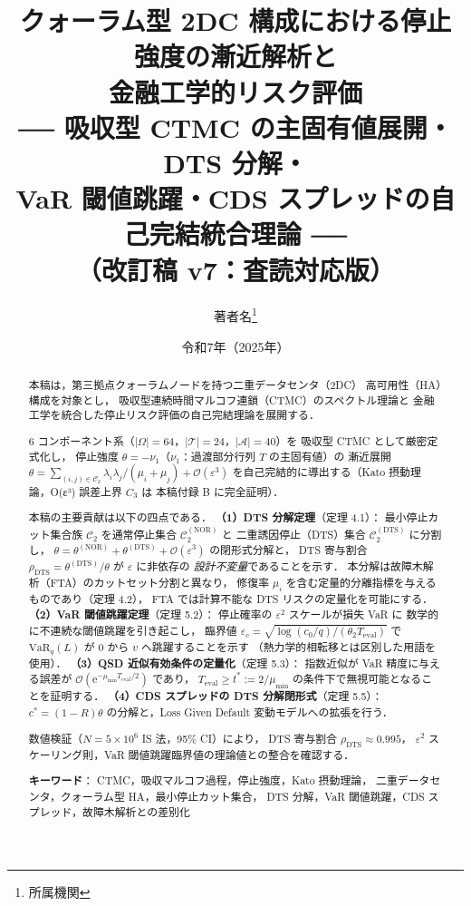 \documentclass[12pt,a4paper]{article}
\title{%
  \textbf{クォーラム型 2DC 構成における停止強度の漸近解析と\\
  金融工学的リスク評価}\\[0.5em]
  \large
  ── 吸収型 CTMC の主固有値展開・DTS 分解・\\
  VaR 閾値跳躍・CDS スプレッドの自己完結統合理論 ──\\[0.3em]
  \small（改訂稿 v7：査読対応版）
}
\author{著者名\thanks{所属機関}}
\date{令和7年（2025年）}
\theoremstyle{plain}
\theoremstyle{definition}
\theoremstyle{remark}
\newcommand{\calO}{\mathcal{O}}
\newcommand{\calA}{\mathcal{A}}
\newcommand{\calT}{\mathcal{T}}
\newcommand{\eps}{\varepsilon}
\newcommand{\e}{\mathrm{e}}
\newcommand{\VaR}{\mathrm{VaR}}
\newcommand{\calCtwo}{\mathcal{C}_2}
\newcommand{\calCNOR}{\calCtwo^{(\mathrm{NOR})}}
\newcommand{\calCDTS}{\calCtwo^{(\mathrm{DTS})}}
\newcommand{\thetaNOR}{\theta^{(\mathrm{NOR})}}
\newcommand{\thetaDTS}{\theta^{(\mathrm{DTS})}}
\newcommand{\rhoDTS}{\rho_{\mathrm{DTS}}}
\newcommand{\Teval}{T_{\mathrm{eval}}}
\begin{document}
\maketitle\thispagestyle{empty}

\begin{abstract}
本稿は，第三拠点クォーラムノードを持つ二重データセンタ（2DC）
高可用性（HA）構成を対象とし，
吸収型連続時間マルコフ連鎖（CTMC）のスペクトル理論と
金融工学を統合した停止リスク評価の自己完結理論を展開する．

6 コンポーネント系（$|\Omega|=64$，$|\calT|=24$，$|\calA|=40$）を
吸収型 CTMC として厳密定式化し，
停止強度 $\theta = -\nu_1$（$\nu_1$：過渡部分行列 $T$ の主固有値）の
漸近展開 $\theta = \sum_{(i,j)\in\calCtwo}\lambda_i\lambda_j/(\mu_i+\mu_j)+\calO(\eps^3)$
を自己完結的に導出する（Kato 摂動理論，O(ε³) 誤差上界 $C_3$ は
本稿付録 B に完全証明）．

本稿の主要貢献は以下の四点である．
\textbf{（1）DTS 分解定理}（定理 4.1）：
最小停止カット集合族 $\calCtwo$ を通常停止集合 $\calCNOR$ と
二重誘因停止（DTS）集合 $\calCDTS$ に分割し，
$\theta = \thetaNOR + \thetaDTS + \calO(\eps^3)$ の閉形式分解と，
DTS 寄与割合 $\rhoDTS = \thetaDTS/\theta$ が $\eps$ に非依存の
\emph{設計不変量}であることを示す．
本分解は故障木解析（FTA）のカットセット分割と異なり，
修復率 $\mu_i$ を含む定量的分離指標を与えるものであり（定理 4.2），
FTA では計算不能な DTS リスクの定量化を可能にする．
\textbf{（2）VaR 閾値跳躍定理}（定理 5.2）：
停止確率の $\eps^2$ スケールが損失 VaR に
数学的に不連続な閾値跳躍を引き起こし，
臨界値 $\eps_c = \sqrt{\log(c_0/q)/(\theta_2\Teval)}$ で
$\VaR_q(L)$ が $0$ から $v$ へ跳躍することを示す
（熱力学的相転移とは区別した用語を使用）．
\textbf{（3）QSD 近似有効条件の定量化}（定理 5.3）：
指数近似が VaR 精度に与える誤差が $\calO(\e^{-\mu_{\min}\Teval/2})$ であり，
$\Teval \ge t^* := 2/\mu_{\min}$ の条件下で無視可能となることを証明する．
\textbf{（4）CDS スプレッドの DTS 分解閉形式}（定理 5.5）：
$c^* = (1-R)\theta$ の分解と，Loss Given Default 変動モデルへの拡張を行う．

数値検証（$N=5\times10^6$ IS 法，95\% CI）により，
DTS 寄与割合 $\rhoDTS \approx 0.995$，
$\eps^2$ スケーリング則，VaR 閾値跳躍臨界値の理論値との整合を確認する．

\medskip
\noindent\textbf{キーワード}：
CTMC，吸収マルコフ過程，停止強度，Kato 摂動理論，
二重データセンタ，クォーラム型 HA，最小停止カット集合，
DTS 分解，VaR 閾値跳躍，CDS スプレッド，故障木解析との差別化
\end{abstract}
\end{document}
